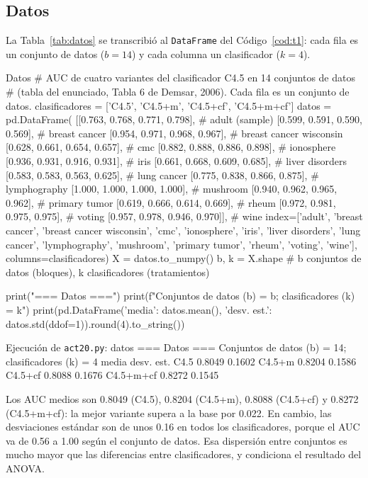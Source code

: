 \documentclass[11pt,letterpaper]{article}
\begin{document}
\subsection{Datos}

La Tabla~\ref{tab:datos} se transcribió al \texttt{DataFrame} del Código~\ref{cod:t1}: cada fila es un conjunto de datos ($b = 14$) y cada columna un clasificador ($k = 4$).

\begin{codigo}[label=cod:t1]{Datos}
# AUC de cuatro variantes del clasificador C4.5 en 14 conjuntos de datos
# (tabla del enunciado, Tabla 6 de Demsar, 2006). Cada fila es un conjunto de datos.
clasificadores = ['C4.5', 'C4.5+m', 'C4.5+cf', 'C4.5+m+cf']
datos = pd.DataFrame(
    [[0.763, 0.768, 0.771, 0.798],   # adult (sample)
     [0.599, 0.591, 0.590, 0.569],   # breast cancer
     [0.954, 0.971, 0.968, 0.967],   # breast cancer wisconsin
     [0.628, 0.661, 0.654, 0.657],   # cmc
     [0.882, 0.888, 0.886, 0.898],   # ionosphere
     [0.936, 0.931, 0.916, 0.931],   # iris
     [0.661, 0.668, 0.609, 0.685],   # liver disorders
     [0.583, 0.583, 0.563, 0.625],   # lung cancer
     [0.775, 0.838, 0.866, 0.875],   # lymphography
     [1.000, 1.000, 1.000, 1.000],   # mushroom
     [0.940, 0.962, 0.965, 0.962],   # primary tumor
     [0.619, 0.666, 0.614, 0.669],   # rheum
     [0.972, 0.981, 0.975, 0.975],   # voting
     [0.957, 0.978, 0.946, 0.970]],  # wine
    index=['adult', 'breast cancer', 'breast cancer wisconsin', 'cmc', 'ionosphere', 'iris',
           'liver disorders', 'lung cancer', 'lymphography', 'mushroom', 'primary tumor',
           'rheum', 'voting', 'wine'],
    columns=clasificadores)
X = datos.to_numpy()
b, k = X.shape  # b conjuntos de datos (bloques), k clasificadores (tratamientos)

print("=== Datos ===")
print(f"Conjuntos de datos (b) = {b}; clasificadores (k) = {k}")
print(pd.DataFrame({'media': datos.mean(), 'desv. est.': datos.std(ddof=1)}).round(4).to_string())
\end{codigo}

\begin{consola}[label=out:t1]{Ejecución de \texttt{act20.py}: datos}
=== Datos ===
Conjuntos de datos (b) = 14; clasificadores (k) = 4
            media  desv. est.
C4.5       0.8049      0.1602
C4.5+m     0.8204      0.1586
C4.5+cf    0.8088      0.1676
C4.5+m+cf  0.8272      0.1545
\end{consola}

Los AUC medios son 0.8049 (C4.5), 0.8204 (C4.5+m), 0.8088 (C4.5+cf) y 0.8272 (C4.5+m+cf): la mejor variante supera a la base por 0.022. En cambio, las desviaciones estándar son de unos 0.16 en todos los clasificadores, porque el AUC va de 0.56 a 1.00 según el conjunto de datos. Esa dispersión entre conjuntos es mucho mayor que las diferencias entre clasificadores, y condiciona el resultado del ANOVA.
\end{document}
